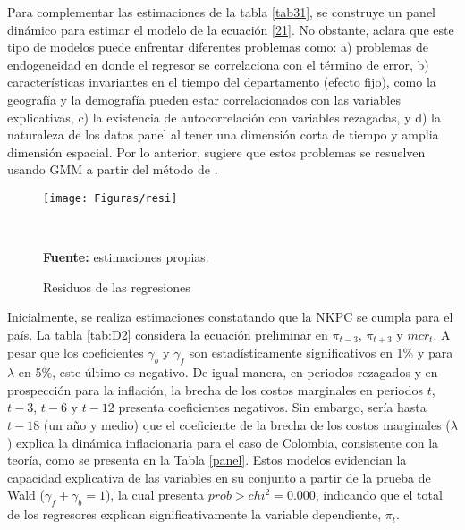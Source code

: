 Para complementar las estimaciones de la tabla \ref{tab31}, se construye un panel dinámico para estimar el modelo de la ecuación \eqref{21}. No obstante, \cite{mileva2007using} aclara que este tipo de modelos puede enfrentar diferentes problemas como: a) problemas de endogeneidad en donde el regresor se correlaciona con el término de error, b) características invariantes en el tiempo del departamento (efecto fijo), como la geografía y la demografía pueden estar correlacionados con las variables explicativas, c)  la existencia de autocorrelación con variables rezagadas, y d) la naturaleza de los datos panel al tener una dimensión corta de tiempo y amplia dimensión espacial. Por lo anterior, \cite{mileva2007using}  sugiere que estos problemas se resuelven usando GMM a partir del método de \cite{arellano1991some}.\\

\begin{figure}%
  	\centering 		
  	\caption{Residuos de las regresiones}
	\texttt{[image: Figuras/resi]}
	\raggedright %
		\label{anefig2}\\
  \raggedright  \scriptsize \textbf{Fuente:} estimaciones propias.
	\end{figure}
Inicialmente, se realiza estimaciones constatando que la NKPC se cumpla para el país. La tabla \ref{tab:D2} considera la ecuación preliminar en $\pi_{t-3}$, $\pi_{t+3}$ y $mcr_{t}$. A pesar que los coeficientes $\gamma_{b}$ y $\gamma_{f}$ son estadísticamente significativos en 1\% y para $\lambda$ en 5\%, este último es negativo. De igual manera, en periodos rezagados y en prospección para la inflación, la brecha de los costos marginales en periodos $t$, $t-3$, $t-6$ y $t-12$ presenta coeficientes negativos. Sin embargo, sería hasta  $t-18$ (un año y medio) que el coeficiente de la brecha de los costos marginales ($\lambda$)  explica la dinámica inflacionaria para el caso de Colombia, consistente con la teoría, como se presenta en la Tabla \ref{panel}. Estos modelos evidencian la capacidad explicativa de las variables en su conjunto a partir de la prueba de Wald ($\gamma_{f}+\gamma_{b}=1$), la cual presenta $prob>chi^{2} =0.000$, indicando que el total de los regresores explican significativamente la variable dependiente, $\pi_{t}$.

